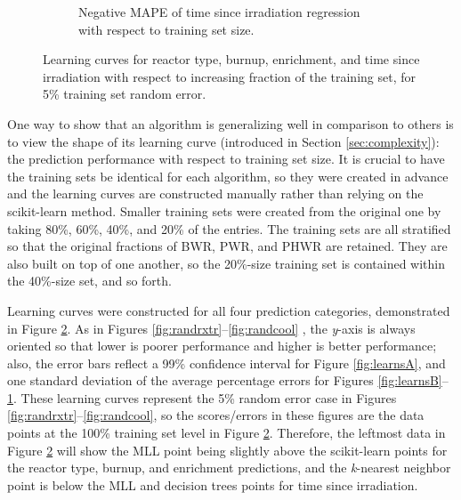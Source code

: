 \begin{figure}[!htb]
\begin{subfigure}[b]{0.50\textwidth}
    \caption{Negative \gls{MAPE} of time since irradiation regression with 
             respect to training set size.}
    \label{fig:learnsD}
  \end{subfigure}
  \caption[Learning curves for all four prediction parameters]
          {Learning curves for reactor type, burnup, enrichment, and time 
           since irradiation with respect to increasing fraction of the 
           training set, for 5\% training set random error.}
  \label{fig:learns}
\end{figure}

One way to show that an algorithm is generalizing well in comparison to others
is to view the shape of its learning curve (introduced in Section
\ref{sec:complexity}): the prediction performance with respect to training set
size.  It is crucial to have the training sets be identical for each algorithm,
so they were created in advance and the learning curves are constructed
manually rather than relying on the scikit-learn method.  Smaller training sets
were created from the original one by taking 80\%, 60\%, 40\%, and 20\% of the
entries. The training sets are all stratified so that the original fractions of
\gls{BWR}, \gls{PWR}, and \gls{PHWR} are retained. They are also built on top
of one another, so the 20\%-size training set is contained within the 40\%-size
set, and so forth.

Learning curves were constructed for all four prediction categories,
demonstrated in Figure \ref{fig:learns}. As in Figures
\ref{fig:randrxtr}--\ref{fig:randcool} , the \textit{y}-axis is always oriented
so that lower is poorer performance and higher is better performance; also, the
error bars reflect a 99\% confidence interval for Figure \ref{fig:learnsA}, and
one standard deviation of the average percentage errors for Figures
\ref{fig:learnsB}--\ref{fig:learnsD}.  These learning curves represent the 5\%
random error case in Figures \ref{fig:randrxtr}--\ref{fig:randcool}, so the
scores/errors in these figures are the data points at the 100\% training set
level in Figure \ref{fig:learns}.  Therefore, the leftmost data in Figure
\ref{fig:learns} will show the \gls{MLL} point being slightly above the
scikit-learn points for the reactor type, burnup, and enrichment predictions,
and the \textit{k}-nearest neighbor point is below the \gls{MLL} and decision
trees points for time since irradiation.  

